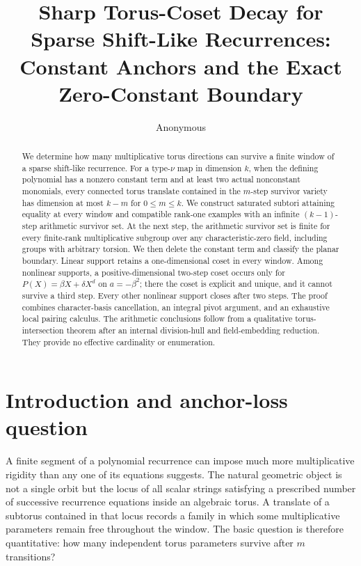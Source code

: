 \documentclass[11pt]{article}
\title{Sharp Torus-Coset Decay for Sparse Shift-Like Recurrences:\\
Constant Anchors and the Exact Zero-Constant Boundary}
\author{Anonymous}
\date{}
\theoremstyle{definition}
\theoremstyle{remark}
\begin{document}
\maketitle

\begin{abstract}
We determine how many multiplicative torus directions can survive a finite window of a sparse shift-like recurrence. For a type-$\nu$ map in dimension $k$, when the defining polynomial has a nonzero constant term and at least two actual nonconstant monomials, every connected torus translate contained in the $m$-step survivor variety has dimension at most $k-m$ for $0\leq m\leq k$. We construct saturated subtori attaining equality at every window and compatible rank-one examples with an infinite $(k-1)$-step arithmetic survivor set. At the next step, the arithmetic survivor set is finite for every finite-rank multiplicative subgroup over any characteristic-zero field, including groups with arbitrary torsion. We then delete the constant term and classify the planar boundary. Linear support retains a one-dimensional coset in every window. Among nonlinear supports, a positive-dimensional two-step coset occurs only for $P(X)=\beta X+\delta X^d$ on $a=-\beta^2$; there the coset is explicit and unique, and it cannot survive a third step. Every other nonlinear support closes after two steps. The proof combines character-basis cancellation, an integral pivot argument, and an exhaustive local pairing calculus. The arithmetic conclusions follow from a qualitative torus-intersection theorem after an internal division-hull and field-embedding reduction. They provide no effective cardinality or enumeration.
\end{abstract}

\section{Introduction and anchor-loss question}
\label{sec:introduction}

A finite segment of a polynomial recurrence can impose much more multiplicative rigidity than any one of its equations suggests.  The natural geometric object is not a single orbit but the locus of all scalar strings satisfying a prescribed number of successive recurrence equations inside an algebraic torus.  A translate of a subtorus contained in that locus records a family in which some multiplicative parameters remain free throughout the window.  The basic question is therefore quantitative: how many independent torus parameters survive after $m$ transitions?
\end{document}
